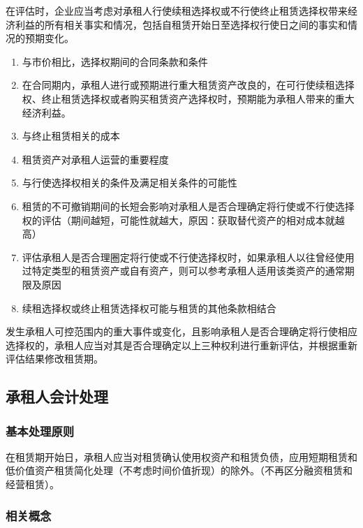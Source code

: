 \documentclass[UTF8,12pt]{ctexart}
\numberwithin{equation}{section} %
\numberwithin{figure}{section}
\numberwithin{table}{section}
\begin{document}
	在评估时，企业应当考虑对承租人行使续租选择权或不行使终止租赁选择权带来经济利益的所有相关事实和情况，包括自租赁开始日至选择权行使日之间的事实和情况的预期变化。
	
	\begin{enumerate}
		\item 与市价相比，选择权期间的合同条款和条件
		
		\item 在合同期内，承租人进行或预期进行重大租赁资产改良的，在可行使续租选择权、终止租赁选择权或者购买租赁资产选择权时，预期能为承租人带来的重大经济利益。
		
		\item 与终止租赁相关的成本
		
		\item 租赁资产对承租人运营的重要程度
		
		\item 与行使选择权相关的条件及满足相关条件的可能性
		
		\item 租赁的不可撤销期间的长短会影响对承租人是否合理确定将行使或不行使选择权的评估（期间越短，可能性就越大，原因：获取替代资产的相对成本就越高）
		
		\item 评估承租人是否合理圈定将行使或不行使选择权时，如果承租人以往曾经使用过特定类型的租赁资产或自有资产，则可以参考承租人适用该类资产的通常期限及原因
		
		\item 续租选择权或终止租赁选择权可能与租赁的其他条款相结合
	\end{enumerate}
	
	发生承租人可控范围内的重大事件或变化，且影响承租人是否合理确定将行使相应选择权的，承租人应当对其是否合理确定以上三种权利进行重新评估，并根据重新评估结果修改租赁期。
	
	\subsection{承租人会计处理}
	\subsubsection{基本处理原则}
	在租赁期开始日，承租人应当对租赁确认使用权资产和租赁负债，应用短期租赁和低价值资产租赁简化处理（不考虑时间价值折现）的除外。（不再区分融资租赁和经营租赁）。
	
	\subsubsection{相关概念}
\end{document}
